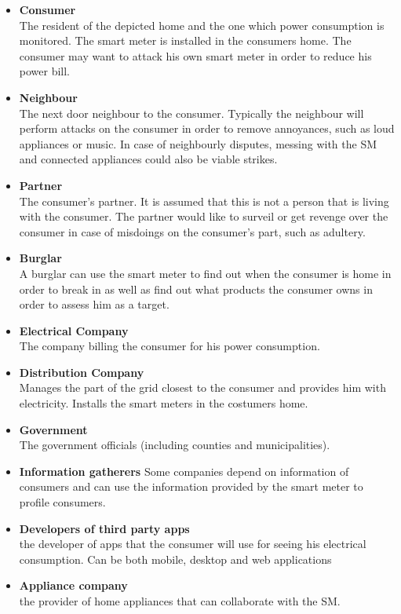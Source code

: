 \begin{itemize}
\item \textbf{Consumer}\\
The resident of the depicted home and the one which power consumption is monitored.
The smart meter is installed in the consumers home.
The consumer may want to attack his own smart meter in order to reduce his power bill.
\item \textbf{Neighbour}\\
The next door neighbour to the consumer.
Typically the neighbour will perform attacks on the consumer in order to remove annoyances, such as loud appliances or music.
In case of neighbourly disputes, messing with the SM and connected appliances could also be viable strikes.
\item \textbf{Partner}\\
The consumer's partner.
It is assumed that this is not a person that is living with the consumer.
The partner would like to surveil or get revenge over the consumer in case of misdoings on the consumer's part, such as adultery.
\item \textbf{Burglar}\\ A burglar can use the smart meter to find out when the consumer is home in order to break in as well as find out what products the consumer owns in order to assess him as a target.
\item \textbf{Electrical Company}\\
The company billing the consumer for his power consumption.
\item \textbf{Distribution Company}\\
Manages the part of the grid closest to the consumer and provides him with electricity.
Installs the smart meters in the costumers home.
\item \textbf{Government}\\
The government officials (including counties and municipalities).
\item \textbf{Information gatherers} Some companies depend on information of consumers and can use the information provided by the smart meter to profile consumers.
\item \textbf{Developers of third party apps}\\
the developer of apps that the consumer will use for seeing his electrical consumption. Can be both mobile, desktop and web applications
\item \textbf{Appliance company}\\ the provider of home appliances that can collaborate with the SM.

\end{itemize}
